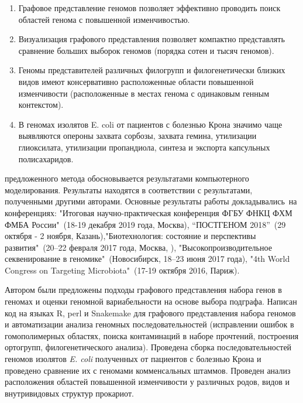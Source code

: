 {}
\begin{enumerate}[beginpenalty=10000] %
	
    \item Графовое представление геномов позволяет эффективно проводить поиск областей генома с повышенной изменчивостью.

	\item Визуализация графового представления позволяет компактно представлять сравнение больших выборок геномов (порядка сотен и тысяч геномов).

 	\item Геномы представителей различных филогрупп и филогенетически близких видов имеют консервативно расположенные области повышенной изменчивости (расположенные в местах генома с одинаковым генным контекстом).
 	
     \item В геномах изолятов E. coli от пациентов с болезнью Крона значимо чаще выявляются опероны захвата сорбозы, захвата гемина, утилизации глиоксилата, утилизации пропандиола, синтеза и экспорта капсульных полисахаридов.

\end{enumerate}


{\reliability} предложенного метода обосновывается результатами компьютерного моделирования. Результаты находятся в соответствии с результатами, полученными другими авторами. Основные результаты работы докладывались~на конференциях: "Итоговая научно-практическая конференция ФГБУ ФНКЦ ФХМ ФМБА России"\ (18-19 декабря 2019 года, Москва), “ПОСТГЕНОМ 2018”\ (29 октября - 2 ноября, Казань),"Биотехнология: состояние и перспективы развития"\ (20–22 февраля 2017 года, Москва, ), "Высокопроизводительное секвенирование в геномике"\ (Новосибирск, 18–23 июня 2017 года), "4th World Congress on Targeting Microbiota"\ (17-19 октября 2016, Париж).


{\contribution} 
Автором были предложены подходы графового представления набора генов в геномах и оценки геномной вариабельности на основе выбора подграфа. Написан код на языках R, perl и Snakemake для графового представления набора геномов и автоматизации анализа геномных последовательностей (исправлении ошибок в гомополимерных областях, поиска контаминаций в наборе прочтений, построения ортогрупп, филогенетического анализа). Проведена сборка последовательностей геномов изолятов \textit{E. coli} полученных от пациентов с болезнью Крона и проведено сравнение их с геномами комменсальных штаммов. Проведен анализ расположения областей повышенной изменчивости у различных родов, видов и внутривидовых структур прокариот.

